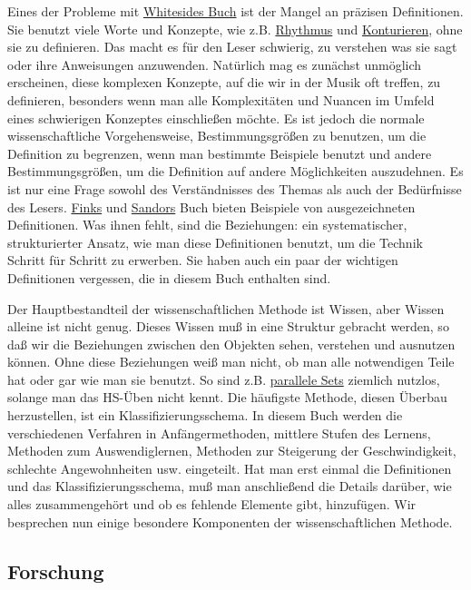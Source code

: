 Eines der Probleme mit \hyperref[Whiteside]{Whitesides Buch} ist der Mangel an präzisen Definitionen.
Sie benutzt viele Worte und Konzepte, wie z.B. \hyperref[c1iii1b]{Rhythmus} und \hyperref[c1iii8]{Konturieren}, ohne sie zu definieren.
Das macht es für den Leser schwierig, zu verstehen was sie sagt oder ihre Anweisungen anzuwenden.
Natürlich mag es zunächst unmöglich erscheinen, diese komplexen Konzepte, auf die wir in der Musik oft treffen, zu definieren, besonders wenn man alle Komplexitäten und Nuancen im Umfeld eines schwierigen Konzeptes einschließen möchte.
Es ist jedoch die normale wissenschaftliche Vorgehensweise, Bestimmungsgrößen zu benutzen, um die Definition zu begrenzen, wenn man bestimmte Beispiele benutzt und andere Bestimmungsgrößen, um die Definition auf andere Möglichkeiten auszudehnen.
Es ist nur eine Frage sowohl des Verständnisses des Themas als auch der Bedürfnisse des Lesers.
\hyperref[Fink]{Finks} und \hyperref[Sandor]{Sandors} Buch bieten Beispiele von ausgezeichneten Definitionen.
Was ihnen fehlt, sind die Beziehungen: ein systematischer, strukturierter Ansatz, wie man diese Definitionen benutzt, um die Technik Schritt für Schritt zu erwerben.
Sie haben auch ein paar der wichtigen Definitionen vergessen, die in diesem Buch enthalten sind.

Der Hauptbestandteil der wissenschaftlichen Methode ist Wissen, aber Wissen alleine ist nicht genug.
Dieses Wissen muß in eine Struktur gebracht werden, so daß wir die Beziehungen zwischen den Objekten sehen, verstehen und ausnutzen können.
Ohne diese Beziehungen weiß man nicht, ob man alle notwendigen Teile hat oder gar wie man sie benutzt.
So sind z.B. \hyperref[c1ii11]{parallele Sets} ziemlich nutzlos, solange man das HS-Üben nicht kennt.
Die häufigste Methode, diesen Überbau herzustellen, ist ein Klassifizierungsschema.
In diesem Buch werden die verschiedenen Verfahren in Anfängermethoden, mittlere Stufen des Lernens, Methoden zum Auswendiglernen, Methoden zur Steigerung der Geschwindigkeit, schlechte Angewohnheiten usw. eingeteilt.
Hat man erst einmal die Definitionen und das Klassifizierungsschema, muß man anschließend die Details darüber, wie alles zusammengehört und ob es fehlende Elemente gibt, hinzufügen.
Wir besprechen nun einige besondere Komponenten der wissenschaftlichen Methode.


\subsection{Forschung}
\label{c3_3c}

